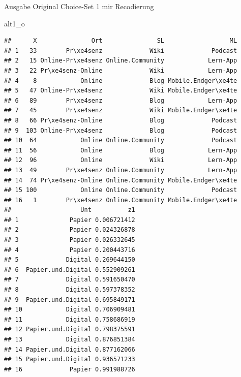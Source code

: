 \documentclass[12pt,ngerman,a4paper,ignorenonframetext,]{beamer}
\newenvironment{Shaded}{\begin{snugshade}}{\end{snugshade}}
\newcommand{\NormalTok}[1]{#1}
\begin{document}
\begin{frame}{Ausgabe Original Choice-Set 1 mir
Recodierung}
\protect\hypertarget{ausgabe-original-choice-set-1-mir-recodierung}{}

\begin{Shaded}
\begin{Highlighting}[]
\NormalTok{alt1_o}
\end{Highlighting}
\end{Shaded}

\begin{verbatim}
##      X               Ort               SL                  ML
## 1   33        Pr\xe4senz             Wiki             Podcast
## 2   15 Online-Pr\xe4senz Online.Community            Lern-App
## 3   22 Pr\xe4senz-Online             Wiki            Lern-App
## 4    8            Online             Blog Mobile.Endger\xe4te
## 5   47 Online-Pr\xe4senz             Wiki Mobile.Endger\xe4te
## 6   89        Pr\xe4senz             Blog            Lern-App
## 7   45        Pr\xe4senz             Wiki Mobile.Endger\xe4te
## 8   66 Pr\xe4senz-Online             Blog             Podcast
## 9  103 Online-Pr\xe4senz             Blog             Podcast
## 10  64            Online Online.Community             Podcast
## 11  56            Online             Blog            Lern-App
## 12  96            Online             Wiki            Lern-App
## 13  49        Pr\xe4senz Online.Community            Lern-App
## 14  74 Pr\xe4senz-Online Online.Community Mobile.Endger\xe4te
## 15 100            Online Online.Community             Podcast
## 16   1        Pr\xe4senz Online.Community Mobile.Endger\xe4te
##                   Unt          z1
## 1              Papier 0.006721412
## 2              Papier 0.024326878
## 3              Papier 0.026332645
## 4              Papier 0.200443716
## 5             Digital 0.269644150
## 6  Papier.und.Digital 0.552909261
## 7             Digital 0.591650470
## 8             Digital 0.597378352
## 9  Papier.und.Digital 0.695849171
## 10            Digital 0.706909481
## 11            Digital 0.758686919
## 12 Papier.und.Digital 0.798375591
## 13            Digital 0.876851384
## 14 Papier.und.Digital 0.877162066
## 15 Papier.und.Digital 0.936571233
## 16             Papier 0.991988726
\end{verbatim}

\end{frame}
\end{document}
